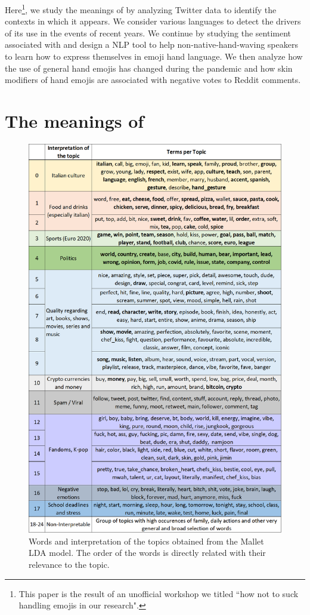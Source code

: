 \documentclass{article}
\begin{document}
Here\footnote{This paper is the result of an unofficial workshop we titled ``how not to suck handling emojis in our research".}, we study the meanings of  by analyzing Twitter data to identify the contexts in which it appears. We consider various languages to detect the drivers of its use in the events of recent years. We continue by studying the sentiment associated with  and design a NLP tool to help non-native-hand-waving speakers to learn how to express themselves in emoji hand language. We then analyze how the use of general hand emojis has changed during the pandemic and how skin modifiers of hand emojis are associated with negative votes to Reddit comments.

\section{The meanings of }

\begin{figure}
    \centering
    \includegraphics[width=\linewidth]{Plots/topicmodel/topic_models_table.png}
    \caption{Words and interpretation of the topics obtained from the Mallet LDA model. The order of the words is directly related with their relevance to the topic.}
    \label{fig:topic_model}
\end{figure}
\end{document}
